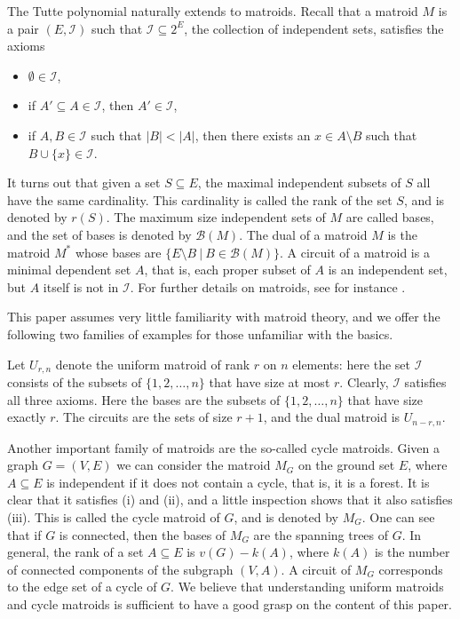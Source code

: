 \documentclass[12pt,a4paper]{amsart}
\numberwithin{equation}{section}
\theoremstyle{plain}
\theoremstyle{definition}
\newcommand{\1}{\textbf{1}}
\begin{document}
The Tutte polynomial naturally extends to matroids. Recall that a matroid $M$ is a pair $(E,\mathcal{I})$ such that $\mathcal{I}\subseteq 2^{E}$, the collection of independent sets,  satisfies the axioms 
\begin{itemize}
\item[(i)] $\emptyset \in \mathcal{I}$, 
\item[(ii)] if $A'\subseteq A\in \mathcal{I}$, then $A'\in \mathcal{I}$, 
\item[(iii)] if $A,B\in \mathcal{I}$ such that $|B|<|A|$, then there exists an $x\in A\setminus B$ such that $B\cup \{x\} \in \mathcal{I}$. 
\end{itemize}
It turns out that given a set $S\subseteq E$, the maximal independent subsets of $S$ all have the same cardinality. This cardinality is called the rank of the set $S$, and is denoted by $r(S)$. The maximum size independent sets of $M$ are called bases, and the set of bases is denoted by $\mathcal{B}(M)$. The dual of a matroid $M$ is the matroid  $M^*$ whose bases are $\{E\setminus B\ |\ B\in \mathcal{B}(M) \}$. A circuit of a matroid is a minimal dependent set $A$, that is, each proper subset of $A$ is an independent set, but $A$ itself is not in $\mathcal{I}$. For further details on matroids, see for instance \cite{oxley1992matroid}.
\medskip

This paper assumes very little familiarity with matroid theory, and we offer the following two  families of examples for those unfamiliar with the basics. 

Let $U_{r,n}$ denote the uniform matroid of rank $r$ on $n$ elements: here the set $\mathcal{I}$ consists of the subsets of $\{1,2,\dots ,n\}$ that have size at most $r$. Clearly, $\mathcal{I}$ satisfies all three axioms. Here the bases are the subsets of $\{1,2,\dots ,n\}$ that have size exactly $r$. The circuits are the sets of size $r+1$, and the dual matroid is $U_{n-r,n}$.

Another important family of matroids are the so-called cycle matroids. Given a graph $G=(V,E)$ we can consider the matroid $M_G$ on the ground set $E$, where $A\subseteq E$ is independent if it does not contain a cycle, that is, it is a forest. It is clear that it satisfies (i) and (ii), and a little inspection shows that it also satisfies (iii). This is called the cycle matroid of $G$, and is denoted by $M_G$. One can see that if $G$ is connected, then the bases of $M_G$ are the spanning trees of $G$. In general, the rank of a set $A\subseteq E$ is $v(G)-k(A)$, where $k(A)$ is the number of connected components of the subgraph $(V,A)$. A circuit of $M_G$ corresponds to the edge set of a cycle of $G$. We believe that  understanding uniform matroids and cycle matroids is sufficient to have a good grasp on the content of this paper.
\bigskip
\end{document}
